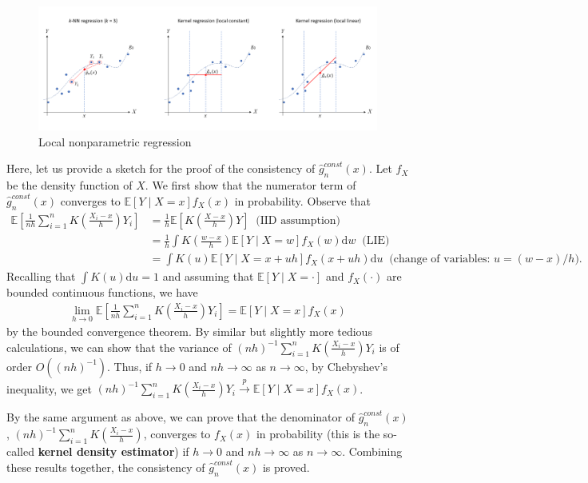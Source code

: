 \documentclass[10.5pt, A4paper, openany, uplatex]{book}
\newcommand{\E}{\mathbb{E}}
\renewcommand{\hat}{\widehat}
\numberwithin{equation}{section}
\begin{document}
\begin{figure}[h!]
	\begin{center}
		\includegraphics[width = 18cm]{localreg.png}
		\caption{Local nonparametric regression}
	\end{center}
\end{figure}

Here, let us provide a sketch for the proof of the consistency of $\hat g^{const}_n(x)$.
Let $f_X$ be the density function of $X$.
We first show that the numerator term of $\hat g^{const}_n(x)$ converges to $\E[Y \mid X = x]f_X(x)$ in probability.
Observe that
\begin{align*}
	\E\left[\frac{1}{nh} \sum_{i = 1}^n K\left( \frac{X_i - x}{h}\right) Y_i \right] 
	& = \frac{1}{h}\E\left[ K\left( \frac{X - x}{h}\right) Y \right] \;\; \text{(IID assumption)}\\
	& = \frac{1}{h}\int K\left( \frac{w - x}{h}\right) \E[ Y \mid X = w] f_X (w)\text{d}w \;\; \text{(LIE)} \\
	& = \int K(u) \E[ Y \mid X = x + uh] f_X (x + uh)\text{d}u \;\; \text{(change of variables: $u = (w-x)/h$)}.
\end{align*}
Recalling that $\int K(u)\text{d}u = 1$ and assuming that $\E[ Y \mid X = \cdot]$ and $f_X (\cdot)$ are bounded continuous functions, we have 
\begin{align*}
	\lim_{h \to 0} \E\left[\frac{1}{nh} \sum_{i = 1}^n K\left( \frac{X_i - x}{h}\right) Y_i \right] = \E[ Y \mid X = x] f_X (x)
\end{align*}
by the bounded convergence theorem.
By similar but slightly more tedious calculations, we can show that the variance of $(nh)^{-1} \sum_{i = 1}^n K\left( \frac{X_i - x}{h}\right) Y_i$ is of order $O((nh)^{-1})$.
Thus, if $h \to 0$ and $nh \to \infty$ as $n \to \infty$, by Chebyshev's inequality, we get $(nh)^{-1} \sum_{i = 1}^n K\left( \frac{X_i - x}{h}\right) Y_i \overset{p}{\to} \E[ Y \mid X = x] f_X (x)$.

By the same argument as above, we can prove that the denominator of $\hat g^{const}_n(x)$, $(nh)^{-1} \sum_{i = 1}^n K\left( \frac{X_i - x}{h}\right)$, converges to $f_X(x)$ in probability (this is the so-called \textbf{kernel density estimator}) if $h \to 0$ and $nh \to \infty$ as $n \to \infty$.
Combining these results together, the consistency of $\hat g^{const}_n(x)$ is proved.
\end{document}
